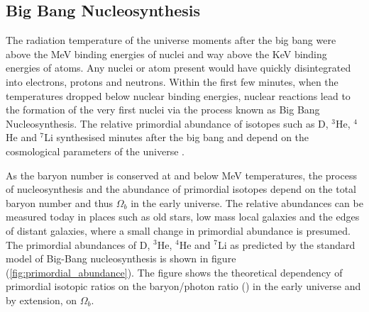 \subsection{Big Bang Nucleosynthesis}
\label{subsec:BBN}

The radiation temperature of the universe moments after the big bang were above the MeV binding energies of nuclei and way above the KeV binding energies of atoms. Any nuclei or atom present would have quickly disintegrated into electrons, protons and neutrons. Within the first few minutes, when the temperatures dropped below nuclear binding energies, nuclear reactions lead to the formation of the very first nuclei via the process known as Big Bang Nucleosynthesis. The relative primordial abundance of isotopes such as D, $^{3}$He, $^{4}$He and $^{7}$Li synthesised minutes after the big bang and depend on the cosmological parameters of the universe \cite{pns}. 

As the baryon number is conserved at and below MeV temperatures, the process of nucleosynthesis and the abundance of primordial isotopes depend on the total baryon number and thus $\Omega_{b}$ in the early universe. The relative abundances can be measured today in places such as old stars, low mass local galaxies and the edges of distant galaxies, where a small change in primordial abundance is presumed. The primordial abundances of D, $^{3}$He, $^{4}$He and $^{7}$Li as predicted by the standard model of Big-Bang nucleosynthesis is shown in figure (\ref{fig:primordial_abundance}). The figure shows the theoretical dependency of primordial isotopic ratios on the baryon/photon ratio (\eta) in the early universe and by extension, on $\Omega_{b}$.

